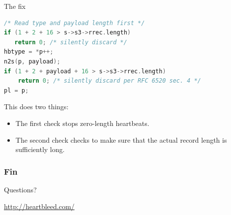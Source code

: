\documentclass[10pt]{beamer}
\begin{document}
\begin{frame}[fragile]{The fix}
\begin{lstlisting}[language=c,morekeywords={memcpy,n2s,s2n}]
/* Read type and payload length first */
if (1 + 2 + 16 > s->s3->rrec.length)
   return 0; /* silently discard */
hbtype = *p++;
n2s(p, payload);
if (1 + 2 + payload + 16 > s->s3->rrec.length)
    return 0; /* silently discard per RFC 6520 sec. 4 */
pl = p;
\end{lstlisting}

This does two things: 
\begin{itemize}
  \item The first check stops zero-length heartbeats.
  \item The second check checks to make sure that the actual record length is sufficiently long.
\end{itemize}

  
\end{frame}



\begin{frame}
\frametitle{Fin}
\begin{center}
\large{Questions?}

\vspace{2em}

\url{http://heartbleed.com/}

\end{center}
\end{frame}
\end{document}
